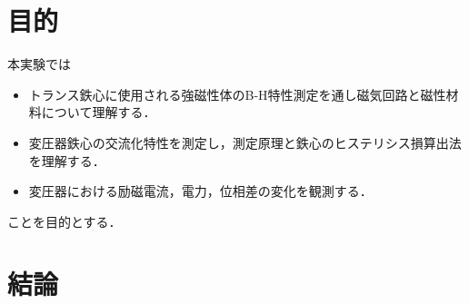 \documentclass[11pt,dvipdfmx]{ujarticle}
\begin{document}
\begin{jikkenTitle}
 \subTitle{} 
 \kyoudouII{} 
 \yoteibi{/ 　}
 \yoteibiII{}
 \yoteibiIII{}
\end{jikkenTitle}

\section{目的}
本実験では
\begin{itemize}
	\item トランス鉄心に使用される強磁性体のB-H特性測定を通し磁気回路と磁性材料について理解する．
	\item 変圧器鉄心の交流化特性を測定し，測定原理と鉄心のヒステリシス損算出法を理解する．
	\item 変圧器における励磁電流，電力，位相差の変化を観測する．
\end{itemize}
ことを目的とする．






\section{結論}

\newpage
\end{document}
